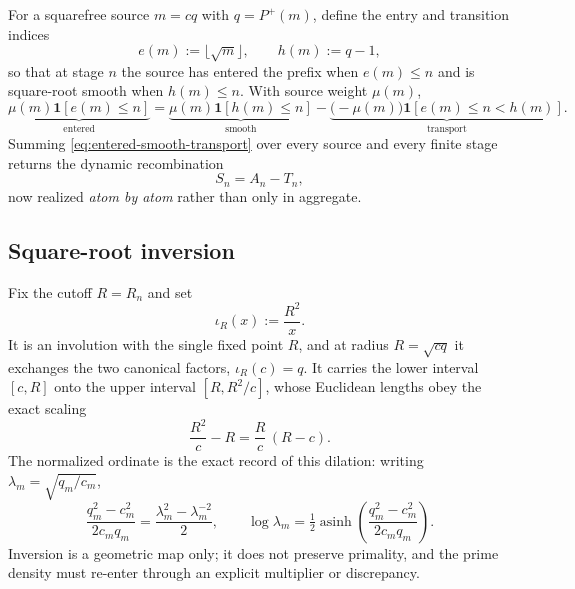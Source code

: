 \documentclass[11pt]{article}
\theoremstyle{definition}
\newcommand{\Pplus}{P^{+}}
\newcommand{\1}{\mathbf{1}}
\begin{document}
For a squarefree source $m=cq$ with $q=\Pplus(m)$, define the entry and transition indices
\begin{equation}
 e(m):=\lfloor\sqrt m\rfloor,
 \qquad
 h(m):=q-1,
 \label{eq:entry-transition-indices}
\end{equation}
so that at stage $n$ the source has entered the prefix when $e(m)\le n$ and is square-root smooth when $h(m)\le n$.  With source weight $\mu(m)$,
\begin{equation}
 \underbrace{\mu(m)\mathbf 1[e(m)\le n]}_{\text{entered}}
 =\underbrace{\mu(m)\mathbf 1[h(m)\le n]}_{\text{smooth}}
 -\underbrace{\bigl(-\mu(m)\bigr)\mathbf 1[e(m)\le n<h(m)]}_{\text{transport}} .
 \label{eq:entered-smooth-transport}
\end{equation}
Summing \cref{eq:entered-smooth-transport} over every source and every finite stage returns the dynamic recombination
\begin{equation}
 S_n=A_n-T_n,
 \label{eq:dynamic-recombination}
\end{equation}
now realized \emph{atom by atom} rather than only in aggregate.

\subsection{Square-root inversion}

Fix the cutoff $R=R_n$ and set
\begin{equation}
 \iota_R(x):=\frac{R^2}{x}.
 \label{eq:sqrt-inversion}
\end{equation}
It is an involution with the single fixed point $R$, and at radius $R=\sqrt{cq}$ it exchanges the two canonical factors, $\iota_R(c)=q$.  It carries the lower interval $[c,R]$ onto the upper interval $[R,R^2/c]$, whose Euclidean lengths obey the exact scaling
\begin{equation}
 \frac{R^2}{c}-R=\frac Rc\,(R-c).
 \label{eq:inversion-length}
\end{equation}
The normalized ordinate is the exact record of this dilation: writing $\lambda_m=\sqrt{q_m/c_m}$,
\begin{equation}
 \frac{q_m^2-c_m^2}{2c_mq_m}
 =\frac{\lambda_m^2-\lambda_m^{-2}}2,
 \qquad
 \log\lambda_m=\tfrac12\operatorname{asinh}\!\left(\frac{q_m^2-c_m^2}{2c_mq_m}\right).
 \label{eq:twoab-dilation}
\end{equation}
Inversion is a geometric map only; it does not preserve primality, and the prime density must re-enter through an explicit multiplier or discrepancy.
\end{document}
